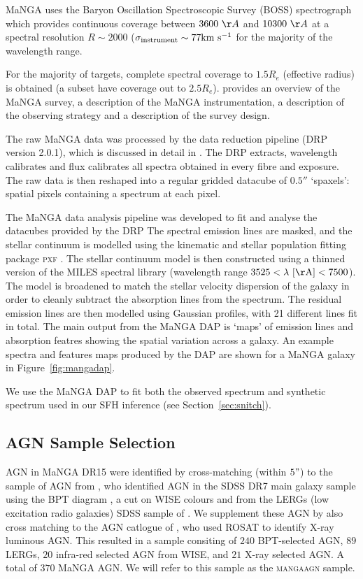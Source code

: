\documentclass[useAMS,usenatbib]{mn2e}
\begin{document}
MaNGA uses the Baryon Oscillation Spectroscopic Survey (BOSS) spectrograph \citep{smee13} which provides continuous coverage between $3600~\AA$ and $10300~\AA$ at a spectral resolution $R \sim 2000$ ($\sigma_{\rm{instrument}} \sim 77 \rm{km}~\rm{s}^{-1}$ for the majority of the wavelength range. 

For the majority of targets, complete spectral coverage to $1.5 R_e$ (effective radius) is obtained (a subset have coverage out to $2.5 R_e$). \cite{bundy15} provides an overview of the MaNGA survey, \cite{drory15} a description of the MaNGA instrumentation, \cite{law15} a description of the observing strategy and \cite{yan16} a description of the survey design. 

The raw MaNGA data was processed by the data reduction pipeline (DRP version 2.0.1), which is discussed in detail in \cite{law16}. The DRP extracts, wavelength calibrates and flux calibrates all spectra obtained in every fibre and exposure. The raw data is then reshaped into a regular gridded datacube of $0.5''$ ‘spaxels’: spatial pixels containing a spectrum at each pixel.  

The MaNGA data analysis pipeline \cite[DAP][]{westfalldap} was developed to fit and analyse the datacubes provided by the DRP The spectral emission lines are masked, and the stellar continuum is modelled using the kinematic and stellar population fitting package \textsc{pxf} \citep{cappellari04}. The stellar continuum model is then constructed using a thinned version of the MILES spectral library (wavelength range $3525 < \lambda~[\rm{\AA}] < 7500$). The model is broadened to match the stellar velocity dispersion of the galaxy in order to cleanly subtract the absorption lines from the spectrum. The residual emission lines are then modelled using Gaussian profiles, with 21 different lines fit in total. The main output from the MaNGA DAP is `maps' of emission lines and absorption featres showing the spatial variation across a galaxy. An example spectra and features maps produced by the DAP are shown for a MaNGA galaxy in Figure~\ref{fig:mangadap}. 

We use the MaNGA DAP to fit both the observed spectrum and synthetic spectrum used in our SFH inference (see Section~\ref{sec:snitch}).

\subsection{AGN Sample Selection}

AGN in MaNGA DR15 were identified by cross-matching (within $5"$) to the sample of AGN from \citet{ellison16}, who identified AGN in the SDSS DR7 main galaxy sample using the BPT diagram \citep[][an optical selection]{bpt}, a cut on WISE colours \citep[$W1 - W2 > 0.8$][an infra-red selection]{wise} and from the LERGs (low excitation radio galaxies) SDSS sample of \citet{heckmanbest12}. We supplement these AGN by also cross matching to the AGN catlogue of \citet{edelson12}, who used ROSAT to identify X-ray luminous AGN. This resulted in a sample consiting of $240$ BPT-selected AGN, $89$ LERGs, $20$ infra-red selected AGN from WISE, and $21$ X-ray selected AGN. A total of $370$ MaNGA AGN. We will refer to this sample as the \textsc{mangaagn} sample. 
\end{document}
